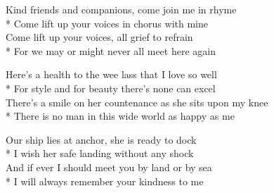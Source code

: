 

\versemark
Kind friends and companions, come join me in rhyme\\*
Come lift up your voices in chorus with mine\\
Come lift up your voices, all grief to refrain\\*
For we may or might never all meet here again


\versemark
Here’s a health to the wee lass that I love so well\\*
For style and for beauty there’s none can excel\\
There’s a smile on her countenance as she sits upon my knee\\*
There is no man in this wide world as happy as me

\versemark
Our ship lies at anchor, she is ready to dock\\*
I wish her safe landing without any shock\\
And if ever I should meet you by land or by sea\\*
I will always remember your kindness to me

